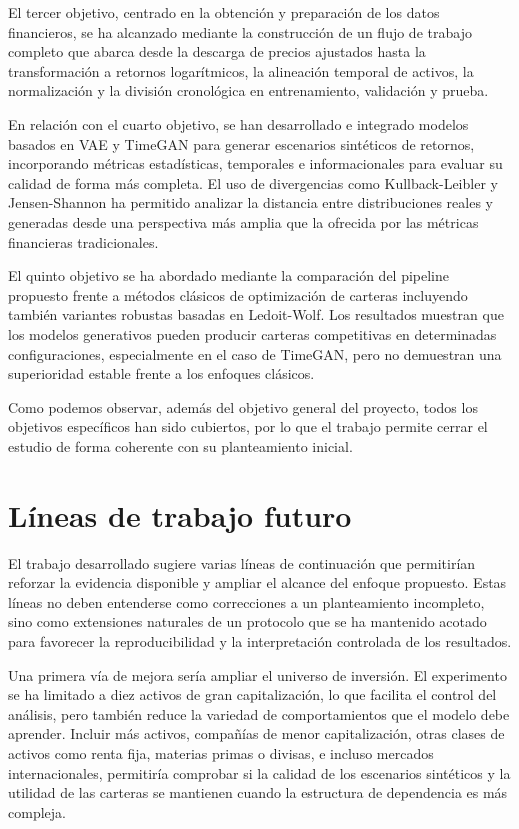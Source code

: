 \documentclass[11pt,a4paper,spanish,oneside]{book}
\numberwithin{equation}{chapter}
\numberwithin{figure}{chapter}
\begin{document}
El tercer objetivo, centrado en la obtención y preparación de los datos financieros, se ha alcanzado mediante la construcción de un flujo de trabajo completo que abarca desde la descarga de precios ajustados hasta la transformación a retornos logarítmicos, la alineación temporal de activos, la normalización y la división cronológica en entrenamiento, validación y prueba.

En relación con el cuarto objetivo, se han desarrollado e integrado modelos basados en VAE y TimeGAN para generar escenarios sintéticos de retornos, incorporando métricas estadísticas, temporales e informacionales para evaluar su calidad de forma más completa. El uso de divergencias como Kullback-Leibler y Jensen-Shannon ha permitido analizar la distancia entre distribuciones reales y generadas desde una perspectiva más amplia que la ofrecida por las métricas financieras tradicionales.

El quinto objetivo se ha abordado mediante la comparación del pipeline propuesto frente a métodos clásicos de optimización de carteras incluyendo también variantes robustas basadas en Ledoit-Wolf. Los resultados muestran que los modelos generativos pueden producir carteras competitivas en determinadas configuraciones, especialmente en el caso de TimeGAN, pero no demuestran una superioridad estable frente a los enfoques clásicos.

Como podemos observar, además del objetivo general del proyecto, todos los objetivos específicos han sido cubiertos, por lo que el trabajo permite cerrar el estudio de forma coherente con su planteamiento inicial.

\section{Líneas de trabajo futuro}
El trabajo desarrollado sugiere varias líneas de continuación que permitirían reforzar la evidencia disponible y ampliar el alcance del enfoque propuesto. Estas líneas no deben entenderse como correcciones a un planteamiento incompleto, sino como extensiones naturales de un protocolo que se ha mantenido acotado para favorecer la reproducibilidad y la interpretación controlada de los resultados.

Una primera vía de mejora sería ampliar el universo de inversión. El experimento se ha limitado a diez activos de gran capitalización, lo que facilita el control del análisis, pero también reduce la variedad de comportamientos que el modelo debe aprender. Incluir más activos, compañías de menor capitalización, otras clases de activos como renta fija, materias primas o divisas, e incluso mercados internacionales, permitiría comprobar si la calidad de los escenarios sintéticos y la utilidad de las carteras se mantienen cuando la estructura de dependencia es más compleja.
\end{document}
